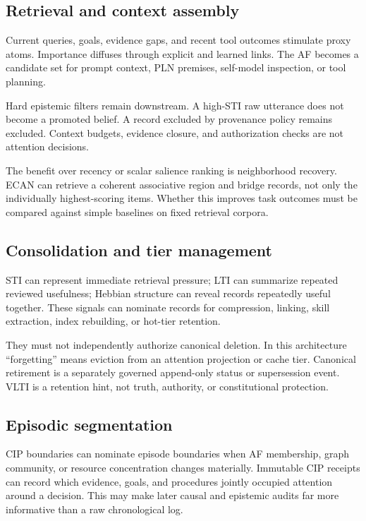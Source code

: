 \documentclass[11pt]{article}
\begin{document}
\subsection{Retrieval and context assembly}

Current queries, goals, evidence gaps, and recent tool outcomes stimulate proxy
atoms.  Importance diffuses through explicit and learned links.  The AF becomes
a candidate set for prompt context, PLN premises, self-model inspection, or
tool planning.

Hard epistemic filters remain downstream.  A high-STI raw utterance does not
become a promoted belief.  A record excluded by provenance policy remains
excluded.  Context budgets, evidence closure, and authorization checks are not
attention decisions.

The benefit over recency or scalar salience ranking is neighborhood recovery.
ECAN can retrieve a coherent associative region and bridge records, not only
the individually highest-scoring items.  Whether this improves task outcomes
must be compared against simple baselines on fixed retrieval corpora.

\subsection{Consolidation and tier management}

STI can represent immediate retrieval pressure; LTI can summarize repeated
reviewed usefulness; Hebbian structure can reveal records repeatedly useful
together.  These signals can nominate records for compression, linking, skill
extraction, index rebuilding, or hot-tier retention.

They must not independently authorize canonical deletion.  In this architecture
``forgetting'' means eviction from an attention projection or cache tier.
Canonical retirement is a separately governed append-only status or
supersession event.  VLTI is a retention hint, not truth, authority, or
constitutional protection.

\subsection{Episodic segmentation}

CIP boundaries can nominate episode boundaries when AF membership, graph
community, or resource concentration changes materially.  Immutable CIP
receipts can record which evidence, goals, and procedures jointly occupied
attention around a decision.  This may make later causal and epistemic audits
far more informative than a raw chronological log.
\end{document}
